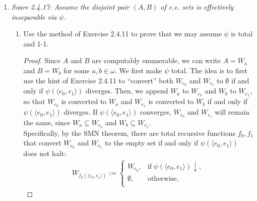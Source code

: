 \documentclass{article}
\begin{document}
\begin{enumerate}[label={\bf Q\arabic*:}]
\begin{proof}
      Now since a set is computable if and only if it is the range of some
      strictly increasing partial recursive function, $f$ will enumerate
      only indices whose range is a computable set, and also all computable
      sets will have a partial recursive function whose range enumerates it
      and whose index is enumerated by $f$. Thus by letting $g(e)$ be a
      total recursive function that outputs the index whose domain equals
      the range of $\varphi_e$, the composition $g\circ f$ will give a
      computable listing of all computable sets. \\

      Once again, we can construct $g$ via the SMN theorem, by first
      constructing another function $\varphi_{g(e)}(x)$ that outputs
      0 if $x\in\text{range}(\varphi_e)$ and that does not halt otherwise.
    \end{proof}

  \item \it Soare 2.4.17: Assume the disjoint pair $(A,B)$ of c.e. sets is
    effectively inseparable via $\psi$.
    \begin{enumerate}[label={(\roman*)}]
      \item Use the method of Exercise 2.4.11 to prove that we may assume
        $\psi$ is total and 1-1.

        \begin{proof}
          Since $A$ and $B$ are computably enumerable, we can write $A=W_a$
          and $B=W_b$ for some $a,b\in\omega$. We first make $\psi$ total.
          The idea is to first use the hint of Exercise 2.4.11 to
          ``convert'' both $W_{e_0}$ and $W_{e_1}$ to $\emptyset$ if and
          only if $\psi(\langle e_0,e_1\rangle)$ diverges. Then, we append
          $W_a$ to $W_{e_0}$ and $W_b$ to $W_{e_1}$, so that $W_{e_0}$ is
          converted to $W_a$ and $W_{e_1}$ is converted to $W_b$ if and
          only if $\psi(\langle e_0,e_1\rangle)$ diverges. If $\psi(\langle
          e_0,e_1\rangle)$ converges, $W_{e_0}$ and $W_{e_1}$ will remain
          the same, since $W_a\subseteq W_{e_0}$ and $W_b\subseteq
          W_{e_1}$. \\

          Specifically, by the SMN theorem, there are total recursive
          functions $f_0,f_1$ that convert $W_{e_0}$ and $W_{e_1}$ to the
          empty set if and only if $\psi(\langle e_0,e_1\rangle)$ does not
          halt:
          \begin{align*}
            W_{f_0(\langle e_0,e_1\rangle)} :=
            \begin{cases}
              W_{e_0}, &\text{if}\; \psi(\langle e_0,e_1\rangle)\downarrow,\\
              \emptyset, &\text{otherwise},\\
            \end{cases}
          \end{align*}


\end{proof}
\end{enumerate}
\end{enumerate}
\end{document}
